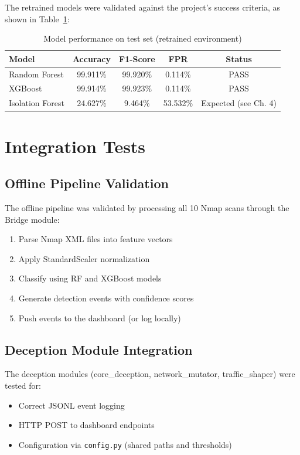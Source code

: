 \documentclass[12pt,a4paper]{report}
\begin{document}
The retrained models were validated against the project's success criteria, as shown in Table~\ref{tab:model_validation}:

\begin{table}[H]
\centering
\caption{Model performance on test set (retrained environment)}
\label{tab:model_validation}
\begin{tabular}{lcccc}
\toprule
\textbf{Model} & \textbf{Accuracy} & \textbf{F1-Score} & \textbf{FPR} & \textbf{Status} \\
\midrule
Random Forest & 99.911\% & 99.920\% & 0.114\% & PASS \\
XGBoost & 99.914\% & 99.923\% & 0.114\% & PASS \\
Isolation Forest & 24.627\% & 9.464\% & 53.532\% & Expected (see Ch. 4) \\
\bottomrule
\end{tabular}
\end{table}

\section{Integration Tests}

\subsection{Offline Pipeline Validation}

The offline pipeline was validated by processing all 10 Nmap scans through the Bridge module:

\begin{enumerate}
    \item Parse Nmap XML files into feature vectors
    \item Apply StandardScaler normalization
    \item Classify using RF and XGBoost models
    \item Generate detection events with confidence scores
    \item Push events to the dashboard (or log locally)
\end{enumerate}

\subsection{Deception Module Integration}

The deception modules (core\_deception, network\_mutator, traffic\_shaper) were tested for:
\begin{itemize}
    \item Correct JSONL event logging
    \item HTTP POST to dashboard endpoints
    \item Configuration via \texttt{config.py} (shared paths and thresholds)
\end{itemize}
\end{document}
